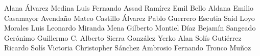 Alana Álvarez Medina
Luis Fernando Assad Ramírez
Emil Bello Aldana
Emilio Casamayor Avendaño
Mateo Castillo Álvarez
Pablo Guerrero Escutia
Said Loyo Morales
Luis Leonardo Miranda Mena
Gilberto Montiel Díaz
Bejamín Sangeado Gerónimo
Guillermo C. Alberto Sierra González
Yerko Alan Solís Gutiérrez
Ricardo Solís Victoria
Christopher Sánchez Ambrosio
Fernando Tronco Muñoz
